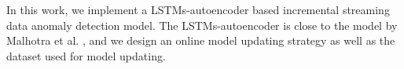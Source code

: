 In this work, we implement a LSTMs-autoencoder based incremental streaming data anomaly detection model. The LSTMs-autoencoder is close to the model by Malhotra et al. \cite{encdecad}, and we design an online model updating strategy as well as the dataset used for model updating.








